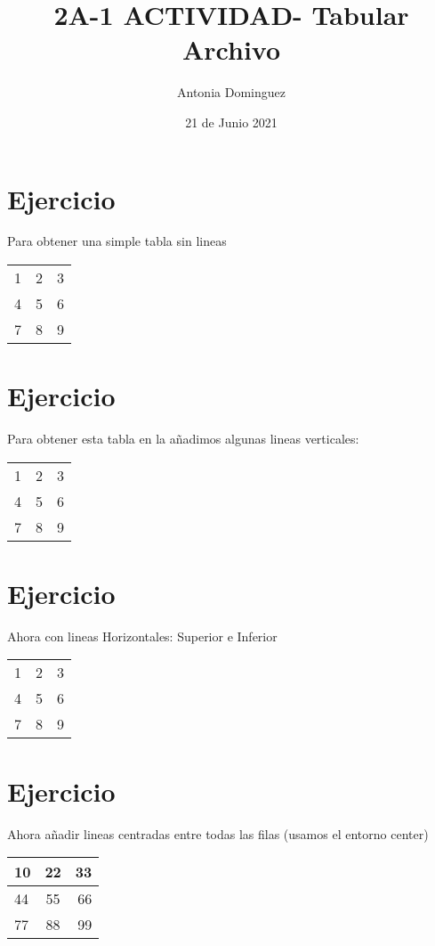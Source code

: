 \documentclass{article}
\title{2A-1 ACTIVIDAD- Tabular Archivo}
\author{Antonia Dominguez}
\date{21 de Junio 2021}
\begin{document}
\maketitle

\section{Ejercicio}

Para obtener una simple tabla sin lineas\\

\begin{tabular}{l c r}

 1 & 2 & 3 \\
 4 & 5 & 6 \\
 7 & 8 & 9 \\   
\end{tabular}

\section{Ejercicio}

Para obtener esta tabla en la añadimos algunas lineas verticales:\\

\begin{tabular}{l|c||r}
  1 & 2 & 3 \\
  4 & 5 & 6 \\
  7 & 8 & 9 \\
\end{tabular}

\section{Ejercicio}
Ahora con lineas Horizontales: Superior e Inferior \\

\begin{tabular}{l|c||r|}
\hline
   1 & 2 & 3 \\
   4 & 5 & 6 \\
   7 & 8 & 9 \\
 \hline
\end{tabular}

\section{Ejercicio}
Ahora añadir lineas centradas entre todas las filas (usamos el entorno center)\\
\begin{center}
\begin{tabular}{l|c||r|}
\hline
   10 & 22 & 33 \\ \hline
   44 & 55 & 66 \\ \hline
   77 & 88 & 99 \\ 
 \hline
\end{tabular}
\end{center}
\end{document}
